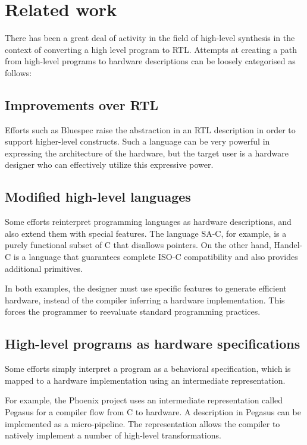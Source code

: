 \documentclass[conference]{IEEEtran}
\begin{document}
\section{Related work}

There has been a great deal of activity in the field of 
high-level synthesis in the context of converting a high
level program to RTL.   Attempts at creating a path from 
high-level programs to hardware descriptions can be loosely 
categorised as follows:

\subsection{Improvements over RTL}

Efforts such as Bluespec\cite{bluespec-memo} raise the abstraction in an
RTL description in order to support higher-level constructs. Such a
language can be very powerful in expressing the architecture of the
hardware, but the target user is a hardware designer who can
effectively utilize this expressive power.

\subsection{Modified high-level languages}

Some efforts reinterpret programming languages as hardware
descriptions, and also extend them with special features. The language
SA-C\cite{SA-C}, for example, is a purely
functional subset of C that disallows pointers. On the other hand,
Handel-C\cite{handel-c} is a language that guarantees complete ISO-C
compatibility and also provides additional primitives.

In both examples, the designer must use specific features to generate
efficient hardware, instead of the compiler inferring a hardware
implementation. This forces the programmer to reevaluate standard
programming practices.


\subsection{High-level programs as hardware specifications}

Some efforts simply interpret a program as a behavioral
specification, which is mapped to a hardware implementation using an
intermediate representation.

For example, the Phoenix project uses an intermediate representation
called Pegasus\cite{pegasus-ir} for a compiler flow from C to
hardware\cite{pegasus-cash}. A description in Pegasus can be
implemented as a micro-pipeline. The representation allows the compiler
to natively implement a number of high-level transformations.
\end{document}
